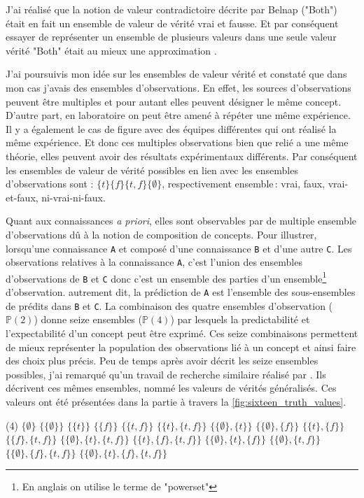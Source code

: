 \begin{refsegment}
J'ai réalisé que la notion de valeur contradictoire décrite par Belnap ("Both") était en fait un ensemble de valeur de vérité vrai et fausse. Et par conséquent essayer de représenter un ensemble de plusieurs valeurs dans une seule valeur vérité "Both" était au mieux une approximation .

J'ai poursuivis mon idée sur les ensembles de valeur vérité et constaté que dans mon cas j'avais des ensembles d'observations. En effet, les sources d'observations peuvent être multiples et pour autant elles peuvent désigner le même concept. D'autre part, en laboratoire on peut être amené à répéter une même expérience. Il y a également le cas de figure avec des équipes différentes qui ont réalisé la même expérience. Et donc ces multiples observations bien que relié a une même théorie, elles peuvent avoir des résultats expérimentaux différents. Par conséquent les ensembles de valeur de vérité possibles en lien avec les ensembles d'observations sont : $\{t\} \{f\} \{t,f\} \{\emptyset\}$, respectivement ensemble : vrai, faux, vrai-et-faux, ni-vrai-ni-faux. 

Quant aux connaissances \textit{a priori}, elles sont observables par de multiple ensemble d'observations dû à la notion de composition de concepts. Pour illustrer, lorsqu'une connaissance \texttt{A} et composé d'une connaissance \texttt{B} et d'une autre \texttt{C}. Les observations relatives à la  connaissance \texttt{A}, c'est l'union des ensembles d'observations de \texttt{B} et \texttt{C} donc c'est un ensemble des parties d'un ensemble\footnote{En anglais on utilise le terme de "powerset"} d'observation. autrement dit, la prédiction de \texttt{A} est l'ensemble des sous-ensembles de prédits dans \texttt{B} et \texttt{C}. La combinaison des quatre ensembles d'observation ($\mathbb{P}(2)$) donne seize ensembles ($\mathbb{P}(4)$) par lesquels la predictabilité et l'expectabilité d'un concept peut être exprimé. Ces seize combinaisons permettent de mieux représenter la population des observations lié à un concept et ainsi faire des choix plus précis. Peu de temps après avoir décrit les seize ensembles possibles, j'ai remarqué qu'un travail de recherche similaire réalisé par \citeauthor{shramko2005some}. Ils décrivent ces mêmes ensembles, nommé les valeurs de vérités généralisés. Ces valeurs ont été présentées dans la partie   à travers la \cref{fig:sixteen_truth_values}.

\begin{tasks}[counter-format = {tsk[1].},label-offset = {0.8em},label-format = {\bfseries}](4)
	\task $\{\emptyset\}$
	\task $\{\{\emptyset\}\}$
	\task $\{\{t\}\}$
	\task $\{\{f\}\}$
	\task $\{\{t,f\}\}$
	\task $\{\{t\},\{t,f\}\}$
	\task $\{\{\emptyset\},\{t\}\}$
	\task $\{\{\emptyset\},\{f\}\}$
	\task $\{\{t\},\{f\}\}$
	\task $\{\{f\},\{t,f\}\}$
	\task $\{\{\emptyset\},\{t\},\{t,f\}\}$
	\task $\{\{t\},\{f\},\{t,f\}\}$
	\task $\{\{\emptyset\},\{t\},\{f\}\}$
	\task $\{\{\emptyset\},\{t,f\}\}$
	\task $\{\{\emptyset\},\{f\},\{t,f\}\}$
	\task $\{\{\emptyset\},\{t\},\{f\},\{t,f\}\}$
\end{tasks}


\end{refsegment}
